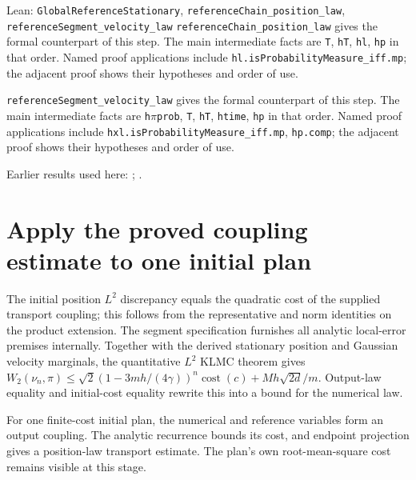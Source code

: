 \documentclass[11pt,a4paper]{article}
\begin{document}
\begin{leanbox}{Lean: \texttt{GlobalReferenceStationary}, \texttt{referenceChain\_\allowbreak{}position\_\allowbreak{}law}, \texttt{referenceSegment\_\allowbreak{}velocity\_\allowbreak{}law}}
\texttt{reference\allowbreak{}Chain\_\allowbreak{}position\_\allowbreak{}law} gives the formal counterpart of this step. The main intermediate facts are \texttt{T}, \texttt{h\allowbreak{}T}, \texttt{hl}, \texttt{hp} in that order. Named proof applications include \texttt{hl.\allowbreak{}is\allowbreak{}Probability\allowbreak{}Measure\_\allowbreak{}iff.\allowbreak{}mp}; the adjacent proof shows their hypotheses and order of use.




\texttt{reference\allowbreak{}Segment\_\allowbreak{}velocity\_\allowbreak{}law} gives the formal counterpart of this step. The main intermediate facts are \texttt{h\ensuremath{\pi}prob}, \texttt{T}, \texttt{h\allowbreak{}T}, \texttt{htime}, \texttt{hp} in that order. Named proof applications include \texttt{hxl.\allowbreak{}is\allowbreak{}Probability\allowbreak{}Measure\_\allowbreak{}iff.\allowbreak{}mp}, \texttt{hp.\allowbreak{}comp}; the adjacent proof shows their hypotheses and order of use.
\end{leanbox}


Earlier results used here: \cite[Section~3.17.1]{LangevinLean2026ULASC}; \cite[Section~3.22.6]{LangevinLean2026ULASC}.

\section{\texorpdfstring{Apply the proved coupling estimate to one initial plan}{Apply the proved coupling estimate to one initial plan}}


The initial position \(L^{2}\) discrepancy equals the quadratic cost of the supplied transport coupling; this follows from the representative and norm identities on the product extension. The segment specification furnishes all analytic local-error premises internally. Together with the derived stationary position and Gaussian velocity marginals, the quantitative \(L^{2}\) KLMC theorem gives \(W_2(\nu_n,\pi)\le\sqrt2(1-3mh/(4\gamma))^n\operatorname{cost}(c)+Mh\sqrt{2d}/m\). Output-law equality and initial-cost equality rewrite this into a bound for the numerical law.



For one finite-cost initial plan, the numerical and reference variables form an output coupling. The analytic recurrence bounds its cost, and endpoint projection gives a position-law transport estimate. The plan’s own root-mean-square cost remains visible at this stage.
\end{document}
